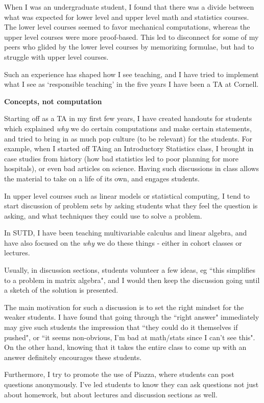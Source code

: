\documentclass[a4paper,12pt]{article}
\begin{document}
When I was an undergraduate student, I found that there was a divide between what was expected for lower level and upper level math and statistics courses. The lower level courses seemed to favor mechanical computations, whereas the upper level courses were more proof-based. This led to disconnect for some of my peers who glided by the lower level courses by memorizing formulae, but had to struggle with upper level courses.

Such an experience has shaped how I see teaching, and I have tried to implement what I see as `responsible teaching' in the five years I have been a TA at Cornell.

{\bf Concepts, not computation}

Starting off as a TA in my first few years, I have created handouts for students which explained {\it why} we do certain computations and make certain statements, and tried to bring in as much pop culture (to be relevant) for the students. For example, when I started off TAing an Introductory Statistics class, I brought in case studies from history (how bad statistics led to poor planning for more hospitals), or even bad articles on science. Having such discussions in class allows the material to take on a life of its own, and engages students. 

In upper level courses such as linear models or statistical computing, I tend to start discussion of problem sets by asking students what they feel the question is asking, and what techniques they could use to solve a problem. 

In SUTD, I have been teaching multivariable calculus and linear algebra, and have also focused on the {\it why} we do these things - either in cohort classes or lectures. 

Usually, in discussion sections, students volunteer a few ideas, eg ``this simplifies to a problem in matrix algebra", and I would then keep the discussion going until a sketch of the solution is presented. 

The main motivation for such a discussion is to set the right mindset for the weaker students. I have found that going through the ``right answer" immediately may give such students the impression that ``they could do it themselves if pushed", or ``it seems non-obvious, I'm bad at math/stats since I can't see this". On the other hand, knowing that it takes the entire class to come up with an answer definitely encourages these students.

Furthermore, I try to promote the use of Piazza, where students can post questions anonymously. I've led students to know they can ask questions not just about homework, but about lectures and discussion sections as well. 
\end{document}
